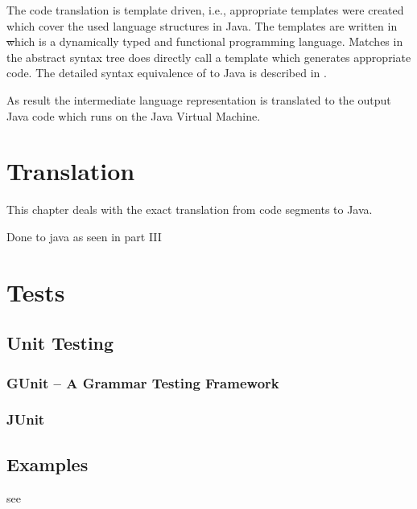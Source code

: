 The code translation is template driven, i.e., appropriate templates
were created which cover the used language structures in Java. The
templates are written in \st which is a dynamically typed and functional
programming language. Matches in the abstract syntax tree does directly
call a template which generates appropriate code. The detailed syntax
equivalence of \ooplss to Java is described in .

As result the intermediate language representation is translated to the
output Java code which runs on the Java Virtual Machine.

\section{Translation}
\label{ctr:translation}
This chapter deals with the exact translation from \ooplss code segments
to Java.

Done to java as seen in part III


\section{Tests}
\subsection{Unit Testing}
\subsubsection{GUnit -- A Grammar Testing Framework}
\subsubsection{JUnit}

\subsection{Examples}
see 
